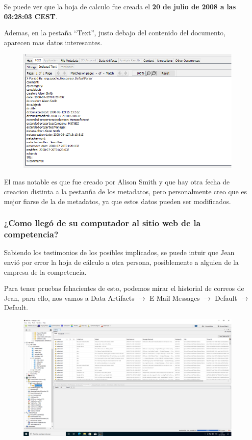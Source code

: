 \documentclass{article}
\begin{document}
Se puede ver que la hoja de calculo fue creada el \textbf{20 de julio de 2008 a las 03:28:03 CEST}.

Ademas, en la pestaña ``Text'', justo debajo del contenido del documento, aparecen mas datos interesantes.

\begin{figure}[H]
    \centering
    \includegraphics[width=\textwidth]{imagenes/Windows/Captura de pantalla (7).png}
\end{figure}

El mas notable es que fue creado por Alison Smith y que hay otra fecha de creacion distinta a la pestanña de los metadatos, pero personalmente creo que es mejor fiarse de la de metadatos, ya que estos datos pueden ser modificados.

\subsubsection*{¿Como llegó de su computador al sitio web de la competencia?}

Sabiendo los testimonios de los posibles implicados, se puede intuir que Jean envió por error la hoja de cálculo a otra persona, posiblemente a alguien de la empresa de la competencia.

Para tener pruebas fehacientes de esto, podemos mirar el historial de correos de Jean, para ello, nos vamos a Data Artifacts $\rightarrow$ E-Mail Messages $\rightarrow$ Default $\rightarrow$ Default.

\begin{figure}[H]
    \centering
    \includegraphics[width=\textwidth]{imagenes/Windows/Captura de pantalla (8).png}
\end{figure}
\end{document}
